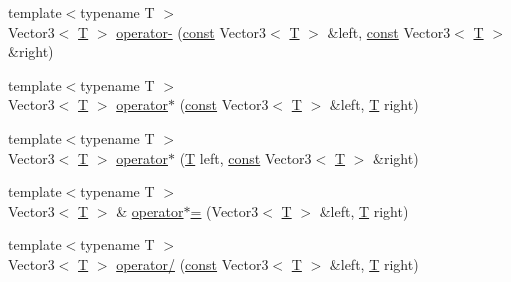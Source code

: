 \begin{DoxyCompactItemize}
\item 
{\footnotesize template$<$typename T $>$ }\\Vector3$<$ \hyperlink{curses_8priv_8h_a5ef253115820acf7d27f3c5c3b02a0f0}{T} $>$ \hyperlink{lapin_2dep_2_s_f_m_l-2_83_2include_2_s_f_m_l_2_system_2_vector3_8inl_a2bf8b0b55c1947527b6046e222221fae}{operator-\/} (\hyperlink{term__entry_8h_a57bd63ce7f9a353488880e3de6692d5a}{const} Vector3$<$ \hyperlink{curses_8priv_8h_a5ef253115820acf7d27f3c5c3b02a0f0}{T} $>$ \&left, \hyperlink{term__entry_8h_a57bd63ce7f9a353488880e3de6692d5a}{const} Vector3$<$ \hyperlink{curses_8priv_8h_a5ef253115820acf7d27f3c5c3b02a0f0}{T} $>$ \&right)
\item 
{\footnotesize template$<$typename T $>$ }\\Vector3$<$ \hyperlink{curses_8priv_8h_a5ef253115820acf7d27f3c5c3b02a0f0}{T} $>$ \hyperlink{lapin_2dep_2_s_f_m_l-2_83_2include_2_s_f_m_l_2_system_2_vector3_8inl_aeba70cd3aa71c62d1e9f16a057c9f7b5}{operator$\ast$} (\hyperlink{term__entry_8h_a57bd63ce7f9a353488880e3de6692d5a}{const} Vector3$<$ \hyperlink{curses_8priv_8h_a5ef253115820acf7d27f3c5c3b02a0f0}{T} $>$ \&left, \hyperlink{curses_8priv_8h_a5ef253115820acf7d27f3c5c3b02a0f0}{T} right)
\item 
{\footnotesize template$<$typename T $>$ }\\Vector3$<$ \hyperlink{curses_8priv_8h_a5ef253115820acf7d27f3c5c3b02a0f0}{T} $>$ \hyperlink{lapin_2dep_2_s_f_m_l-2_83_2include_2_s_f_m_l_2_system_2_vector3_8inl_a8c0523e9a31d09c76db9b2ef0c7faf8a}{operator$\ast$} (\hyperlink{curses_8priv_8h_a5ef253115820acf7d27f3c5c3b02a0f0}{T} left, \hyperlink{term__entry_8h_a57bd63ce7f9a353488880e3de6692d5a}{const} Vector3$<$ \hyperlink{curses_8priv_8h_a5ef253115820acf7d27f3c5c3b02a0f0}{T} $>$ \&right)
\item 
{\footnotesize template$<$typename T $>$ }\\Vector3$<$ \hyperlink{curses_8priv_8h_a5ef253115820acf7d27f3c5c3b02a0f0}{T} $>$ \& \hyperlink{lapin_2dep_2_s_f_m_l-2_83_2include_2_s_f_m_l_2_system_2_vector3_8inl_a07f8a600108d37efbbb202acbe736e08}{operator$\ast$=} (Vector3$<$ \hyperlink{curses_8priv_8h_a5ef253115820acf7d27f3c5c3b02a0f0}{T} $>$ \&left, \hyperlink{curses_8priv_8h_a5ef253115820acf7d27f3c5c3b02a0f0}{T} right)
\item 
{\footnotesize template$<$typename T $>$ }\\Vector3$<$ \hyperlink{curses_8priv_8h_a5ef253115820acf7d27f3c5c3b02a0f0}{T} $>$ \hyperlink{lapin_2dep_2_s_f_m_l-2_83_2include_2_s_f_m_l_2_system_2_vector3_8inl_a14c517aeedef370c1ba27bd1ac60e7d8}{operator/} (\hyperlink{term__entry_8h_a57bd63ce7f9a353488880e3de6692d5a}{const} Vector3$<$ \hyperlink{curses_8priv_8h_a5ef253115820acf7d27f3c5c3b02a0f0}{T} $>$ \&left, \hyperlink{curses_8priv_8h_a5ef253115820acf7d27f3c5c3b02a0f0}{T} right)

\end{DoxyCompactItemize}
